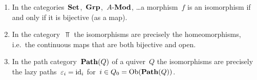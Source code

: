 \begin{example}
  \leavevmode
  \begin{enumerate}
    \item
      In the categories~$\mathbf{Set}$,~$\mathbf{Grp}$,~$\text{$A$-$\mathbf{Mod}$}$, \dots a morphism~$f$ is an isomorphism if and only if it is bijective (as a  map).
    \item
      In the category~$\Top$ the isomorphisms are precisely the homeomorphisms, i.e.\ the continuous maps that are both bijective and open.
    \item
      In the path category~$\mathbf{Path}(Q)$ of a quiver~$Q$ the isomorphisms are precisely the lazy paths~$\varepsilon_i = \operatorname{id}_i$ for~$i \in Q_0 = \operatorname{Ob}(\mathbf{Path}(Q))$.
  \end{enumerate}
\end{example}




